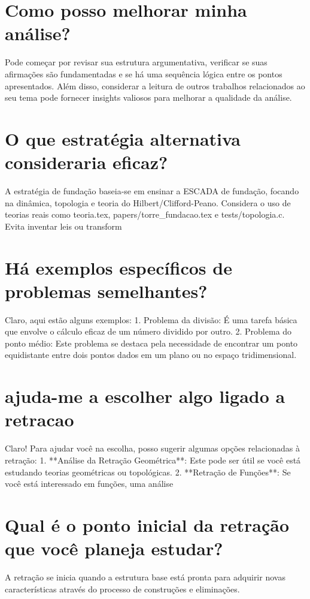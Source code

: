 \documentclass[11pt,a4paper]{article}
\begin{document}
\section{Como posso melhorar minha análise?}
Pode começar por revisar sua estrutura argumentativa, verificar se suas afirmações são fundamentadas e se há uma sequência lógica entre os pontos apresentados. Além disso, considerar a leitura de outros trabalhos relacionados ao seu tema pode fornecer insights valiosos para melhorar a qualidade da análise.

\section{O que estratégia alternativa consideraria eficaz?}
A estratégia de fundação baseia-se em ensinar a ESCADA de fundação, focando na dinâmica, topologia e teoria do Hilbert/Clifford-Peano. Considera o uso de teorias reais como teoria.tex, papers/torre\_fundacao.tex e tests/topologia.c. Evita inventar leis ou transform

\section{Há exemplos específicos de problemas semelhantes?}
Claro, aqui estão alguns exemplos: 1. Problema da divisão: É uma tarefa básica que envolve o cálculo eficaz de um número dividido por outro. 2. Problema do ponto médio: Este problema se destaca pela necessidade de encontrar um ponto equidistante entre dois pontos dados em um plano ou no espaço tridimensional.

\section{ajuda-me a escolher algo ligado a retracao}
Claro! Para ajudar você na escolha, posso sugerir algumas opções relacionadas à retração: 1. **Análise da Retração Geométrica**: Este pode ser útil se você está estudando teorias geométricas ou topológicas. 2. **Retração de Funções**: Se você está interessado em funções, uma análise

\section{Qual é o ponto inicial da retração que você planeja estudar?}
A retração se inicia quando a estrutura base está pronta para adquirir novas características através do processo de construções e eliminações.
\end{document}
